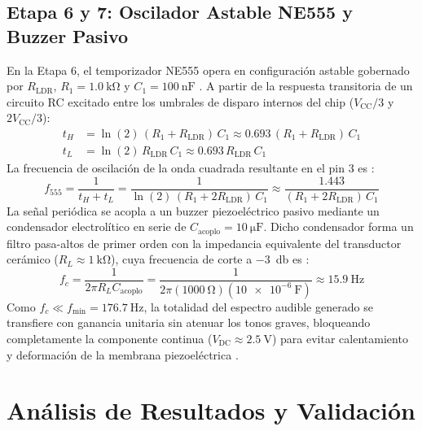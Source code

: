 \documentclass[journal,transmag]{IEEEtran}
\begin{document}
\subsection{Etapa 6 y 7: Oscilador Astable NE555 y Buzzer Pasivo}
En la Etapa 6, el temporizador NE555 opera en configuración astable gobernado por $R_{\text{LDR}}$, $R_1 = \SI{1.0}{\kilo\ohm}$ y $C_1 = \SI{100}{\nano\farad}$ \cite{camenzind2005,ti_ne555}. A partir de la respuesta transitoria de un circuito RC excitado entre los umbrales de disparo internos del chip ($V_{\text{CC}}/3$ y $2V_{\text{CC}}/3$):
\begin{align}
t_H &= \ln(2)\,(R_1 + R_{\text{LDR}})\,C_1 \approx 0.693\,(R_1 + R_{\text{LDR}})\,C_1 \label{eq:th} \\
t_L &= \ln(2)\,R_{\text{LDR}}\,C_1 \approx 0.693\,R_{\text{LDR}}\,C_1 \label{eq:tl}
\end{align}
La frecuencia de oscilación de la onda cuadrada resultante en el pin 3 es \cite{camenzind2005}:
\begin{equation}
f_{555} = \frac{1}{t_H + t_L} = \frac{1}{\ln(2)\,(R_1 + 2R_{\text{LDR}})\,C_1} \approx \frac{1.443}{(R_1 + 2R_{\text{LDR}})\,C_1}
\label{eq:f555}
\end{equation}
La señal periódica se acopla a un buzzer piezoeléctrico pasivo mediante un condensador electrolítico en serie de $C_{\text{acoplo}} = \SI{10}{\micro\farad}$. Dicho condensador forma un filtro pasa-altos de primer orden con la impedancia equivalente del transductor cerámico ($R_L \approx \SI{1}{\kilo\ohm}$), cuya frecuencia de corte a \SI{-3}{\decibel} es \cite{alexander2018,cady1964}:
\begin{equation}
f_c = \frac{1}{2\pi R_L C_{\text{acoplo}}} = \frac{1}{2\pi (\SI{1000}{\ohm})(\SI{10e-6}{\farad})} \approx \SI{15.9}{\hertz}
\label{eq:fc}
\end{equation}
Como $f_c \ll f_{\text{min}} = \SI{176.7}{\hertz}$, la totalidad del espectro audible generado se transfiere con ganancia unitaria sin atenuar los tonos graves, bloqueando completamente la componente continua ($V_{\text{DC}} \approx \SI{2.5}{\volt}$) para evitar calentamiento y deformación de la membrana piezoeléctrica \cite{cady1964}.

\section{Análisis de Resultados y Validación}
\end{document}
